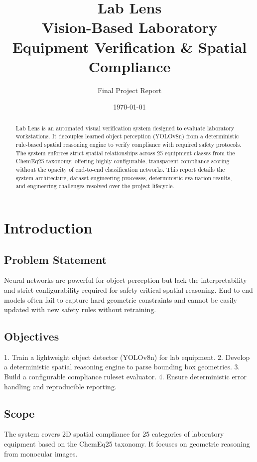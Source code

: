 \documentclass[12pt,a4paper]{report}
\title{\textbf{Lab Lens} \\ \Large Vision-Based Laboratory Equipment Verification \& Spatial Compliance}
\author{Final Project Report}
\date{\today}
\begin{document}
\maketitle

\begin{abstract}
Lab Lens is an automated visual verification system designed to evaluate laboratory workstations. It decouples learned object perception (YOLOv8n) from a deterministic rule-based spatial reasoning engine to verify compliance with required safety protocols. The system enforces strict spatial relationships across 25 equipment classes from the ChemEq25 taxonomy, offering highly configurable, transparent compliance scoring without the opacity of end-to-end classification networks. This report details the system architecture, dataset engineering processes, deterministic evaluation results, and engineering challenges resolved over the project lifecycle.
\end{abstract}

\tableofcontents
\listoffigures
\listoftables

\chapter{Introduction}
\section{Problem Statement}
Neural networks are powerful for object perception but lack the interpretability and strict configurability required for safety-critical spatial reasoning. End-to-end models often fail to capture hard geometric constraints and cannot be easily updated with new safety rules without retraining.

\section{Objectives}
1. Train a lightweight object detector (YOLOv8n) for lab equipment.
2. Develop a deterministic spatial reasoning engine to parse bounding box geometries.
3. Build a configurable compliance ruleset evaluator.
4. Ensure deterministic error handling and reproducible reporting.

\section{Scope}
The system covers 2D spatial compliance for 25 categories of laboratory equipment based on the ChemEq25 taxonomy. It focuses on geometric reasoning from monocular images.
\end{document}
